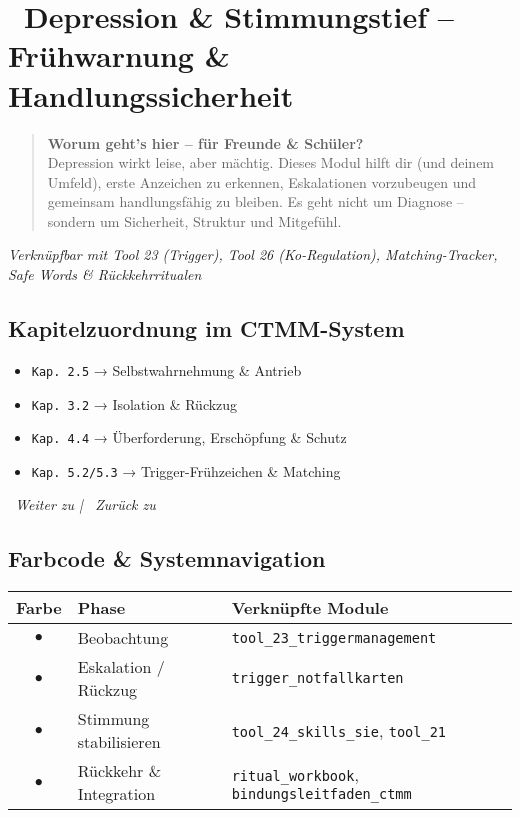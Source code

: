 \section*{\textcolor{ctmmBlue}{\faCloud~Depression \& Stimmungstief -- Frühwarnung \& Handlungssicherheit}}
\label{sec:depression}

\begin{quote}
\textbf{\textcolor{ctmmBlue}{Worum geht's hier -- für Freunde \& Schüler?}}\\
Depression wirkt leise, aber mächtig. Dieses Modul hilft dir (und deinem Umfeld), erste Anzeichen zu erkennen, Eskalationen vorzubeugen und gemeinsam handlungsfähig zu bleiben. Es geht nicht um Diagnose -- sondern um Sicherheit, Struktur und Mitgefühl.
\end{quote}

\textit{Verknüpfbar mit Tool 23 (Trigger), Tool 26 (Ko-Regulation), Matching-Tracker, Safe Words \& Rückkehrritualen}

\subsection*{\textcolor{ctmmBlue}{Kapitelzuordnung im CTMM-System}}

\begin{itemize}
  \item \texttt{Kap. 2.5} → Selbstwahrnehmung \& Antrieb
  \item \texttt{Kap. 3.2} → Isolation \& Rückzug
  \item \texttt{Kap. 4.4} → Überforderung, Erschöpfung \& Schutz
  \item \texttt{Kap. 5.2/5.3} → Trigger-Frühzeichen \& Matching
\end{itemize}

\vspace{0.5cm}
\begin{center}
\textit{\textcolor{ctmmGreen}{\faChevronRight~Weiter zu}  | \textcolor{ctmmBlue}{\faChevronLeft~Zurück zu} }
\end{center}

\subsection*{\textcolor{ctmmBlue}{Farbcode \& Systemnavigation}}

\begin{tabular}{|c|l|l|}
\hline
\textbf{Farbe} & \textbf{Phase} & \textbf{Verknüpfte Module} \\
\hline
\textcolor{ctmmBlue}{$\bullet$} & Beobachtung & \texttt{tool\_23\_triggermanagement} \\
\textcolor{ctmmRed}{$\bullet$} & Eskalation / Rückzug & \texttt{trigger\_notfallkarten} \\
\textcolor{ctmmOrange}{$\bullet$} & Stimmung stabilisieren & \texttt{tool\_24\_skills\_sie}, \texttt{tool\_21} \\
\textcolor{ctmmPurple}{$\bullet$} & Rückkehr \& Integration & \texttt{ritual\_workbook}, \texttt{bindungsleitfaden\_ctmm} \\
\hline
\end{tabular}

